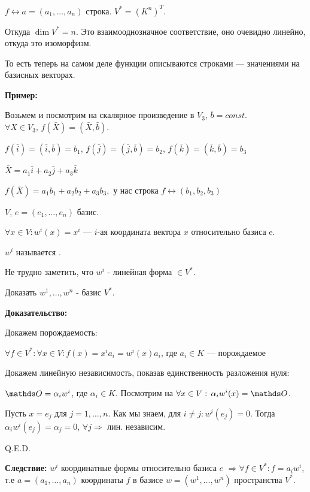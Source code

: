 $f \leftrightarrow a= (a_1,\ldots, a_n)$ строка. %
$V^* = (K^n)^T$. 

Откуда $\dim V^*  = n$. 
Это взаимооднозначное соответствие, оно очевидно линейно, откуда это изоморфизм.

То есть теперь на самом деле функции описываются строками --- значениями на базисных векторах.



\textbf{Пример:} 

 Возьмем и посмотрим на скалярное произведение в
$V_3, \, \bar{b}= const$. $\forall X \in V_3, \, f(\bar{X})=(\bar{X}, \bar{b})$.

$f(\bar{i})=(\bar{i}, \bar{b}) = b_1$, $f(\bar{j})=(\bar{j}, \bar{b}) = b_2$, $f(\bar{k})=(\bar{k}, \bar{b}) = b_3$

$\bar{X}=a_1\bar{i}+a_2\bar{j}+a_3\bar{k}$

$f(\bar{X})=a_1b_1+a_2b_2+a_3b_3, $ у нас строка $f \leftrightarrow (b_1,b_2,b_3)$

 $V$, $e = (e_1,\ldots, e_n)$ базис.

$\forall x \in V: w^i(x) = x^i$ --- $i$-ая координата вектора $x$ относительно базиса e.  

$w^i$ называется .

Не трудно заметить, что $w^i$ - линейная форма $\in V^{*}$.


Доказать $w^1,\ldots,w^n$ - базис $V^*$.

\textbf{Доказательство:}

Докажем порождаемость: 

$\forall f \in V^*: \forall x \in V: f(x) = x^i a_i = w^i(x)a_i$, где $a_i \in K$ --- порождаемое

Докажем линейную независимость, показав единственность разложения нуля:

$\zero = \alpha_i w^i $, где $\alpha_i \in K$. Посмотрим на $\forall x \in V: \, \alpha_iw^i(x)=\zero$.

Пусть $x = e_j$ для $j = 1,\ldots, n$. Как мы знаем, для $i\neq j: w^i(e_j) = 0$. Тогда $\alpha_iw^i(e_j)=\alpha_j =0$,
$\forall j \Rightarrow $ лин. независим.

\hfill Q.E.D.

\textbf{Следствие:} $w^i$ координатные формы относительно базиса $e$
$\Rightarrow \forall f \in V^*: f = a_iw^i$, т.е $a=(a_1,\ldots,a_n)$  координаты $f$ в базисе $w = (w^1,\ldots, w^n)$ пространства $V^*$.

